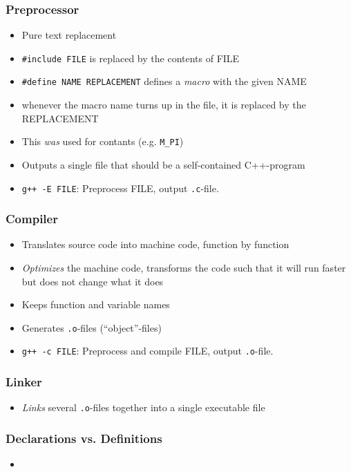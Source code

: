 \documentclass{slides}
\begin{document}
\begin{frame}[fragile]
  \frametitle{Preprocessor}

    \begin{itemize}
    \item Pure text replacement
    \item \lstinline!#include FILE! is replaced by the contents of FILE
    \item \lstinline!#define NAME REPLACEMENT! defines a \emph{macro}
      with the given NAME
    \item whenever the macro name turns up in the file, it is replaced
      by the REPLACEMENT
    \item This \emph{was} used for contants (e.g. \lstinline!M_PI!)
    \item Outputs a single file that should be a self-contained
      C++-program
    \item \lstinline!g++ -E FILE!: Preprocess FILE, output
      \lstinline!.c!-file.
    \end{itemize}
\end{frame}

\begin{frame}[fragile]
  \frametitle{Compiler}

  \begin{itemize}
  \item Translates source code into machine code, function by function
  \item \emph{Optimizes} the machine code, \ie transforms the code
    such that it will run faster but does not change what it does
  \item Keeps function and variable names
  \item Generates \lstinline!.o!-files (``object''-files)
  \item \lstinline!g++ -c FILE!: Preprocess and compile FILE, output
    \lstinline!.o!-file.
  \end{itemize}
\end{frame}

\begin{frame}[fragile]
  \frametitle{Linker}

  \begin{itemize}
  \item \emph{Links} several \lstinline!.o!-files together into a
    single executable file
  \end{itemize}
\end{frame}

\begin{frame}
  \frametitle{Declarations vs. Definitions}
  \begin{itemize}
  \item 
  \end{itemize}
\end{frame}
\end{document}
